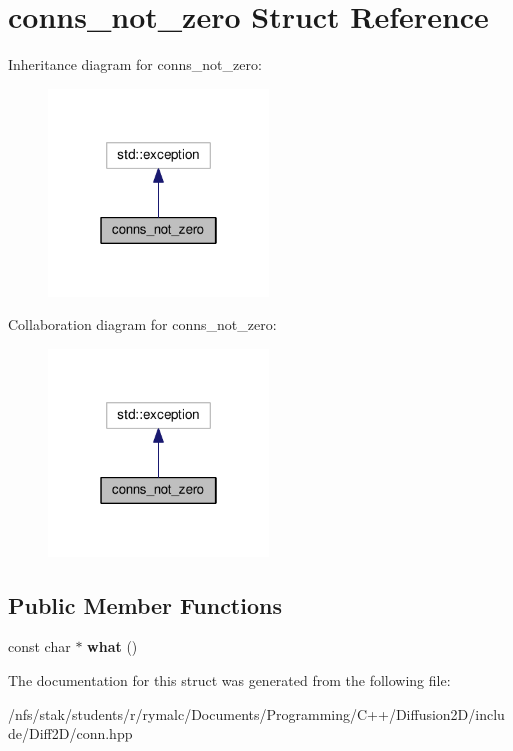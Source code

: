 \hypertarget{structconns__not__zero}{\section{conns\+\_\+not\+\_\+zero Struct Reference}
\label{structconns__not__zero}
}


Inheritance diagram for conns\+\_\+not\+\_\+zero\+:\nopagebreak
\begin{figure}[H]
\begin{center}
\leavevmode
\includegraphics[width=166pt]{structconns__not__zero__inherit__graph}
\end{center}
\end{figure}


Collaboration diagram for conns\+\_\+not\+\_\+zero\+:\nopagebreak
\begin{figure}[H]
\begin{center}
\leavevmode
\includegraphics[width=166pt]{structconns__not__zero__coll__graph}
\end{center}
\end{figure}
\subsection*{Public Member Functions}
\begin{DoxyCompactItemize}
\item 
\hypertarget{structconns__not__zero_af1818629d7bda66a96fd534b92d0bcf9}{const char $\ast$ {\bfseries what} ()}\label{structconns__not__zero_af1818629d7bda66a96fd534b92d0bcf9}

\end{DoxyCompactItemize}


The documentation for this struct was generated from the following file\+:\begin{DoxyCompactItemize}
\item 
/nfs/stak/students/r/rymalc/\+Documents/\+Programming/\+C++/\+Diffusion2\+D/include/\+Diff2\+D/conn.\+hpp\end{DoxyCompactItemize}
